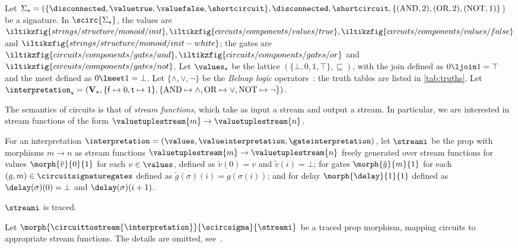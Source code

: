 \documentclass[10pt]{article}
\begin{document}
    \begin{example}\label{ex:interp}
        Let \(\Sigma_\star = (\{\disconnected,\valuetrue,\valuefalse,\shortcircuit\}, \disconnected, \shortcircuit, \{(\text{AND},2),(\text{OR},2),(\text{NOT},1)\}\)) be a signature.
        In \(\scirc{\Sigma_\star}\), the values are \(\iltikzfig{strings/structure/monoid/init}, \iltikzfig{circuits/components/values/true}, \iltikzfig{circuits/components/values/false}\) and \(\iltikzfig{strings/structure/monoid/init-white}\); the gates are \(\iltikzfig{circuits/components/gates/and}, \iltikzfig{circuits/components/gates/or}\) and \(\iltikzfig{circuits/components/gates/not}\).
        Let \(\values_\star\) be the lattice \((\{\bot, 0, 1, \top\},\sqsubseteq)\), with the join defined as \(0 \ljoin 1 = \top\) and the meet defined as \(0 \lmeet 1 = \bot\).
        Let \(\{\wedge,\vee,\neg\}\) be the \emph{Belnap logic} operators~\cite{belnap1977useful}: the truth tables are listed in \cref{tab:truths}.
        Let \(\interpretation_\star = (\mathbf{V}_\star, \{\mathsf{f} \mapsto 0, \mathsf{t} \mapsto 1\}, \{\text{AND} \mapsto \land, \text{OR} \mapsto \lor, \text{NOT} \mapsto \neg\})\).
    \end{example}

    \noindent
    The semantics of circuits is that of \emph{stream functions}, which take as input a stream and output a stream.
    In particular, we are interested in stream functions of the form \(\valuetuplestream{m} \to \valuetuplestream{n}\).

    \begin{definition}
        For an interpretation \(\interpretation = (\values, \valueinterpretation, \gateinterpretation)\), let \(\streami\) be the prop with morphisms \(m \to n\) as stream functions \(\valuetuplestream{m} \to \valuetuplestream{n}\) freely generated over
        stream functions for values \(\morph{\tilde{v}}{0}{1}\) for each \(v \in \values\), defined as \(\tilde{v}(0) = v\) and \(\tilde{v}(i) = \bot\); for gates \(\morph{\tilde{g}}{m}{1}\) for each \((g,m) \in \circuitsignaturegates\) defined as \(\tilde{g}(\sigma)(i) = g(\sigma(i))\); and for delay \(\morph{\delay}{1}{1}\) defined as \(\delay(\sigma)(0) = \bot\) and \(\delay(\sigma)(i+1)\).
    \end{definition}

    \begin{theorem}
        \(\streami\) is traced.
    \end{theorem}

    \begin{definition}\label{def:circuittostreams}
        Let \(\morph{\circuittostream{\interpretation}}{\scircsigma}{\streami}\) be a traced prop morphism, mapping circuits to appropriate stream functions.
        The details are omitted, see~\cite{ghica2022full}.
    \end{definition}
\end{document}
